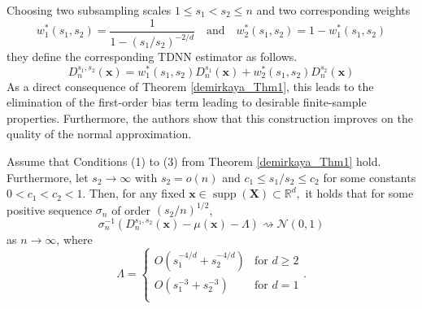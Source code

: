 \documentclass[letterpaper,10pt]{article}
\numberwithin{equation}{section}
\numberwithin{theorem}{section}
\numberwithin{remark}{section}
\numberwithin{example}{section}
\theoremstyle{definition}
\newcommand{\1}{\mathbb{1}}
\begin{document}
Choosing two subsampling scales $1 \leq s_1 < s_2 \leq n$ and two corresponding weights
\begin{equation}
	w_1^{*}(s_1, s_2) = \frac{1}{1-(s_1/s_2)^{-2/d}}
	\quad\text{and}\quad
	w_2^{*}(s_1, s_2) = 1 - w_1^{*}(s_1, s_2)
\end{equation}
they define the corresponding TDNN estimator as follows.
\begin{equation}
	D_n^{s_1, s_2}\left(\mathbf{x}\right)
	= w_1^{*}(s_1, s_2)D_{n}^{s_1}\left(\mathbf{x}\right) + w_2^{*}(s_1, s_2)D_{n}^{s_2}\left(\mathbf{x}\right)
\end{equation}
As a direct consequence of Theorem \ref{demirkaya_Thm1}, this leads to the elimination of the first-order bias term leading to desirable finite-sample properties.
Furthermore, the authors show that this construction improves on the quality of the normal approximation.

\vspace{0.5cm}
\begin{theorem}\label{demirkaya_Thm3}
	Assume that Conditions (1) to (3) from Theorem \ref{demirkaya_Thm1} hold.
	Furthermore, let $s_2 \rightarrow \infty$ with $s_2 = o(n)$ and $c_1 \leq s_1/s_2 \leq c_2$ for some constants $0 < c_1 < c_2 < 1$.
	Then, for any fixed $\mathbf{x} \in \operatorname{supp}(\mathbf{X}) \subset \mathbb{R}^d,$ it holds that for some positive sequence $\sigma_n$ of order $(s_2/n)^{1/2}$,
	\begin{equation}
		\sigma_n^{-1} \left(D_{n}^{s_1, s_2}\left(\mathbf{x}\right) - \mu(\mathbf{x}) - \Lambda\right) \rightsquigarrow \mathcal{N}(0,1)
	\end{equation}
	as $n \rightarrow \infty$, where
	\begin{equation*}
		\Lambda = \begin{cases}
			O\left(s_1^{-4/d} + s_2^{-4/d}\right) & \text{for } d \geq 2 \\
			O\left(s_1^{-3} + s_2^{-3}\right)     & \text{for } d = 1    \\
		\end{cases}.
	\end{equation*}
\end{theorem}
\end{document}
